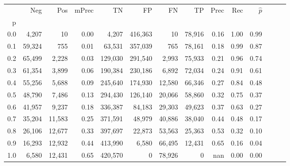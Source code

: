 \begin{tabular}{rrrrrrrrrrrrrr}
\toprule
{} &     Neg &     Pos & mPrec &       TN &       FP &      FN &      TP &  Prec &   Rec & $\hat{p}$ \\
p   &         &         &       &          &          &         &         &       &       &           \\
\midrule
0.0 &   4,207 &      10 &  0.00 &    4,207 &  416,363 &      10 &  78,916 &  0.16 &  1.00 &      0.99 \\
0.1 &  59,324 &     755 &  0.01 &   63,531 &  357,039 &     765 &  78,161 &  0.18 &  0.99 &      0.87 \\
0.2 &  65,499 &   2,228 &  0.03 &  129,030 &  291,540 &   2,993 &  75,933 &  0.21 &  0.96 &      0.74 \\
0.3 &  61,354 &   3,899 &  0.06 &  190,384 &  230,186 &   6,892 &  72,034 &  0.24 &  0.91 &      0.61 \\
0.4 &  55,256 &   5,688 &  0.09 &  245,640 &  174,930 &  12,580 &  66,346 &  0.27 &  0.84 &      0.48 \\
0.5 &  48,790 &   7,486 &  0.13 &  294,430 &  126,140 &  20,066 &  58,860 &  0.32 &  0.75 &      0.37 \\
0.6 &  41,957 &   9,237 &  0.18 &  336,387 &   84,183 &  29,303 &  49,623 &  0.37 &  0.63 &      0.27 \\
0.7 &  35,204 &  11,583 &  0.25 &  371,591 &   48,979 &  40,886 &  38,040 &  0.44 &  0.48 &      0.17 \\
0.8 &  26,106 &  12,677 &  0.33 &  397,697 &   22,873 &  53,563 &  25,363 &  0.53 &  0.32 &      0.10 \\
0.9 &  16,293 &  12,932 &  0.44 &  413,990 &    6,580 &  66,495 &  12,431 &  0.65 &  0.16 &      0.04 \\
1.0 &   6,580 &  12,431 &  0.65 &  420,570 &        0 &  78,926 &       0 &   nan &  0.00 &      0.00 \\
\bottomrule
\end{tabular}
